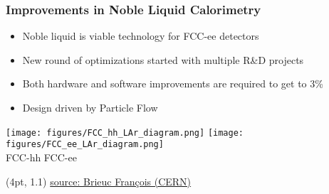 \documentclass[aspectratio=169]{beamer}
\begin{document}
\begin{frame}
  \frametitle{Improvements in Noble Liquid Calorimetry}

  \begin{itemize}
    \item Noble liquid is viable technology for FCC-ee detectors
    \item New round of optimizations started with multiple R\&D projects
    \item Both hardware and software improvements are required to get to 3\%
    \item Design driven by Particle Flow
  \end{itemize}

  \vspace{-1.5em}
  \begin{center}
    \texttt{[image: figures/FCC\_hh\_LAr\_diagram.png]}%
    \hfill
    \texttt{[image: figures/FCC\_ee\_LAr\_diagram.png]}\\[.5em]
    FCC-hh \hspace{16em} FCC-ee
  \end{center}

  \begin{textblock*}{\paperwidth}(4pt, 1.1\textheight)
    {\tiny
     \href{https://indico.cern.ch/event/969249/contributions/4086276/attachments/2132741/3591642/20201029_LAr_workingMeeting_Brieuc.pdf}
          {source: Brieuc François (CERN)}}
  \end{textblock*}
\end{frame}
\end{document}
